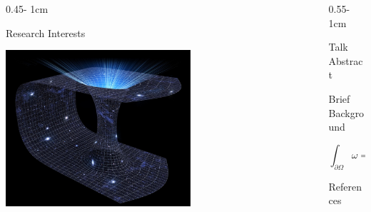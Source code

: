 \documentclass{psuposter}
\begin{document}
\begin{frame}
\begin{columns}
\begin{column}{0.45\textwidth - 1cm}
    \begin{block}{Research Interests}
        \lipsum[2]
        \begin{center}
	    	\includegraphics[width=0.6\textwidth]{template-images/sample-research}    		
    	\end{center}
    \end{block}
\end{column}

\begin{column}{0.55\textwidth - 1cm}


    \begin{block}{Talk Abstract}
        \lipsum[4]
    \end{block}


    \begin{block}{Brief Background}
    
  
        \lipsum[2]
        \cite{DepartmentPhysicsEberly}
        $$\int_{\partial \Omega} \omega = \int_{\Omega} d \omega$$
        \lipsum[2]
        \cite{SearchArXivEprint}
    \end{block}


    \begin{block}{References}
        
		
    \end{block}


\end{column}
\end{columns}
\end{frame}
\end{document}
